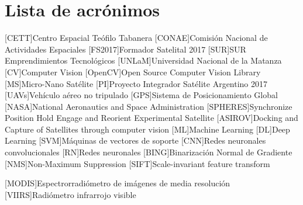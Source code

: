 \chapter*{Lista de acrónimos}
\label{chap:acronimos}

\begin{acronym}[SAOCOM]
[CETT]{Centro Espacial Teófilo Tabanera}
[CONAE]{Comisión Nacional de Actividades Espaciales}
[FS2017]{Formador Satelital 2017}
[SUR]{SUR Emprendimientos Tecnológicos}
[UNLaM]{Universidad Nacional de la Matanza}
[CV]{Computer Vision}
[OpenCV]{Open Source Computer Vision Library}
[MS]{Micro-Nano Satélite}
[PI]{Proyecto Integrador Satélite Argentino 2017}
[UAVs]{Vehículo aéreo no tripulado}
[GPS]{Sistema de Posicionamiento Global}
[NASA]{National Aeronautics and Space Administration}
[SPHERES]{Synchronize Position Hold Engage and Reorient Experimental Satellite}
 [ASIROV]{Docking and Capture of Satellites through computer vision}
[ML]{Machine Learning}
[DL]{Deep Learning}
[SVM]{Máquinas de vectores de soporte}
[CNN]{Redes neuronales convolucionales}
[RN]{Redes neuronales}
[BING]{Binarización Normal de Gradiente}
[NMS]{Non-Maximum Suppression}
[SIFT]{Scale-invariant feature transform}

[MODIS]{Espectrorradiómetro de imágenes de media resolución}
[VIIRS]{Radiómetro infrarrojo visible}
\end{acronym}


